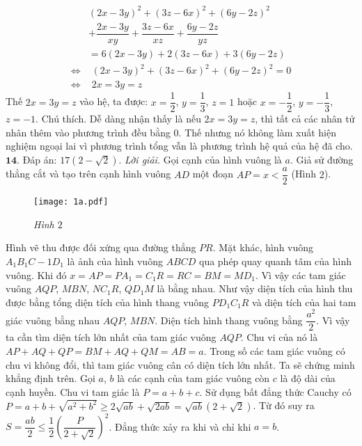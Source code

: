 \begin{multicols}{2}
	\begin{align*}
		&{\left( {2x - 3y} \right)^2} + {\left( {3z - 6x} \right)^2} + {\left( {6y - 2z} \right)^2} \\
		&+ \dfrac{{2x - 3y}}{{xy}} + \dfrac{{3z - 6x}}{{xz}} + \dfrac{{6y - 2z}}{{yz}}\\
		&= 6\left( {2x \!-\! 3y} \right) \!+\! 2\left( {3z \!-\! 6x} \right) \!+\! 3\left( {6y \!-\! 2z} \right)\\
		\Leftrightarrow &\,\,{\left( {2x \!-\! 3y} \right)^2} \!+\! {\left( {3z \!-\! 6x} \right)^2} \!+\! {\left( {6y \!-\! 2z} \right)^2} \!=\! 0\\
		\Leftrightarrow &\,\,2x = 3y = z
	\end{align*}
	Thế $2x = 3y = z$ vào hệ, ta được:  $x = \dfrac{1}{2}$, $y = \dfrac{1}{3}$, $z =1$ hoặc $x = - \dfrac{1}{2}$, $y = - \dfrac{1}{3}$,  $z = -1$.
	\vskip 0.1cm 
	Chú thích. Dễ dàng nhận thấy là nếu  $2x = 3y = z$, thì tất cả các nhân tử nhân thêm vào phương trình đều bằng $0$. Thế nhưng nó không làm xuất hiện nghiệm ngoại lai vì phương trình tổng vẫn là phương trình hệ quả của hệ đã cho.
	\vskip 0.1cm
	$\pmb{14.}$ Đáp án:  $17\left( {2 - \sqrt 2 } \right)$.
	\vskip 0.1cm 
	\textit{Lời giải.} Gọi cạnh của hình vuông là $a$. Giả sử đường thẳng cắt và tạo trên cạnh hình vuông $AD$ một đoạn $AP = x < \dfrac{a}{2}$  (Hình $2$).
	\begin{figure}[H]
		\vspace*{-5pt}
		\centering
		\captionsetup{labelformat= empty, justification=centering}
		\texttt{[image: 1a.pdf]}
		\caption{\small\textit{\color{cackithi}Hình $2$}}
		\vspace*{-10pt}
	\end{figure}
	Hình vẽ thu được đối xứng qua đường thẳng $PR$. Mặt khác, hình vuông $A_1B_1C-1D_1$ là ảnh của hình vuông $ABCD$ qua phép quay quanh tâm của hình vuông. Khi đó  $x = AP = P{A_1} = {C_1}R = RC = BM = M{D_1}$. Vì vậy các tam giác vuông  $AQP$,  $MBN$,  $NC_1R$, $QD_1M$ là bằng nhau. 
	\vskip 0.1cm
	Như vậy diện tích của hình thu được bằng tổng diện tích của hình thang vuông $PD_1C_1R$ và diện tích của hai tam giác vuông bằng nhau  $AQP$,  $MBN$. Diện tích hình thang vuông bằng  $\dfrac{a^2}{2}$. Vì vậy ta cần tìm diện tích lớn nhất của tam giác vuông $AQP$. Chu vi của nó là $AP + AQ + QP = BM + AQ + QM = AB = a$. Trong số các tam giác vuông có chu vi không đổi, thì tam giác vuông cân có diện tích lớn nhất.
	\vskip 0.1cm
	Ta sẽ chứng minh khẳng định trên. Gọi $a$, $b$ là các cạnh của tam giác vuông còn $c$ là độ dài của cạnh huyền. Chu vi tam giác là $P = a + b + c$. Sử dụng bất đẳng thức Cauchy có $P = a + b + \sqrt {{a^2} + {b^2}}  \ge 2\sqrt {ab}  + \sqrt {2ab}  = \sqrt {ab} \left( {2 + \sqrt 2 } \right)$. Từ đó suy ra $S = \dfrac{{ab}}{2} \le \dfrac{1}{2}{\left( {\dfrac{P}{{2 + \sqrt 2 }}} \right)^2}$. Đẳng thức xảy ra khi và chỉ khi $a = b$.

\end{multicols}
